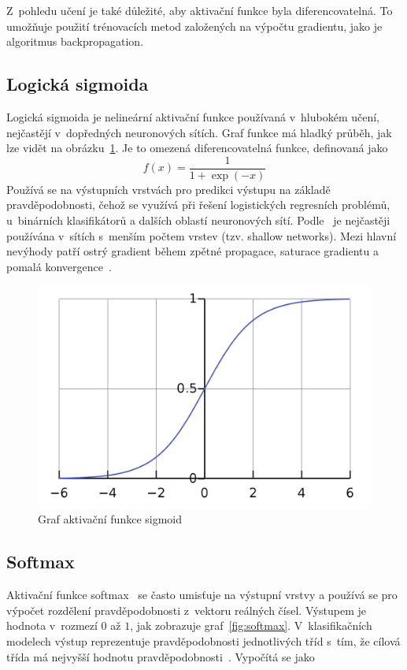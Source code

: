 Z~pohledu učení je také důležité, aby aktivační funkce byla diferencovatelná. To umožňuje použití trénovacích metod založených na výpočtu gradientu, jako je algoritmus backpropagation.



\subsection*{Logická sigmoida}
Logická sigmoida je nelineární aktivační funkce používaná v~hlubokém učení, nejčastějí v~dopředných neuronových sítích. Graf funkce má hladký průběh, jak lze vidět na obrázku~\ref{fig:sigmoid}. Je to omezená diferencovatelná funkce, definovaná jako
\begin{equation}
  f(x) = \frac{1}{1+\exp(-x)}
\end{equation}
Používá se na výstupních vrstvách pro predikci výstupu na základě pravděpodobnosti, čehož se využívá při řešení logistických regresních problémů, u~binárních klasifikátorů a dalších oblastí neuronových sítí. Podle~\cite{NEAL199271} je nejčastěji používána v~sítích s~menším počtem vrstev (tzv. shallow networks). Mezi hlavní nevýhody patří ostrý gradient během zpětné propagace, saturace gradientu a pomalá konvergence~\cite{nwankpa2018activation}.

\begin{figure}[H]
    \centering
    \includegraphics[scale=0.18]{obrazky-figures/sigmoid.png}
    \caption{\label{fig:sigmoid}Graf aktivační funkce sigmoid}
\end{figure}



\subsection*{Softmax}
Aktivační funkce softmax~\cite{mitdeeplearning} se často umisťuje na výstupní vrstvy a používá se pro výpočet rozdělení pravděpodobnosti z~vektoru reálných čísel. Výstupem je hodnota v~rozmezí $0$ až $1$, jak zobrazuje graf~\ref{fig:softmax}. V~klasifikačních modelech výstup reprezentuje pravděpodobnosti jednotlivých tříd s~tím, že cílová třída má nejvyšší hodnotu pravděpodobnosti~\cite{nwankpa2018activation}. Vypočítá se jako

